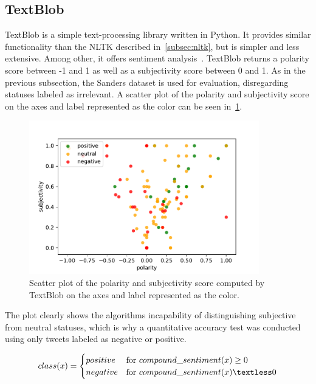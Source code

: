 \subsection{TextBlob}
\label{subsec:textblob}

TextBlob is a simple text-processing library written in Python.
It provides similar functionality than the NLTK described in~\ref{subsec:nltk},
but is simpler and less extensive.
Among other, it offers sentiment analysis~\cite{textblobDocs}.
TextBlob returns a polarity score between -1 and 1 as well as a subjectivity score between 0 and 1.
As in the previous subsection, the Sanders dataset is used for evaluation, disregarding statuses labeled as irrelevant.
A scatter plot of the polarity and subjectivity score on the axes and label represented as the color can be seen in~\ref{fig:textblob}.

\begin{figure}
    \centering
    \caption{Scatter plot of the polarity and subjectivity score computed by TextBlob on the axes and label represented as the color.}
    \label{fig:textblob}
    \includegraphics[width=10cm]{../figures/textblob.pdf}
\end{figure}

The plot clearly shows the algorithms incapability of distinguishing subjective from neutral statuses,
which is why a quantitative accuracy test was conducted using only tweets labeled as negative or positive.

\begin{equation}
    class(x) =
    \begin{cases}
        positive & \text{for } compound\_sentiment(x) \geq 0 \\
        negative & \text{for } compound\_sentiment(x) \textless 0\\
    \end{cases}
\end{equation}

